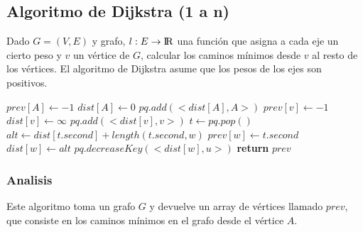 \newpage
\subsection{Algoritmo de Dijkstra (1 a n)}

Dado $G = (V, E)$ y grafo, $l: E \rightarrow {\rm I\!R}$ una funci\'on que asigna a cada eje un cierto peso y $v$ un v\'ertice de $G$, calcular los caminos m\'inimos desde $v$ al resto de los v\'ertices. El algoritmo de Dijkstra asume que los pesos de los ejes son positivos.

\begin{algorithm}
\begin{algorithmic}[1]
  \State $prev[A] \gets -1$
  \State $dist[A] \gets 0$
  \State $pq.add(<dist[A], A>)$
    \State $prev[v] \gets -1$
    \State $dist[v] \gets \infty$
    \State $pq.add(<dist[v], v>)$
  \EndFor
    \State $t \gets pq.pop()$
      \State $alt \gets dist[t.second] + length(t.second, w)$
        \State $prev[w] \gets t.second$
        \State $dist[w] \gets alt$
        \State $pq.decreaseKey(<dist[w], u>)$
      \EndIf
    \EndFor
  \EndWhile
  \State \textbf{return} $prev$
\EndFunction
\end{algorithmic}
\end{algorithm}

\subsubsection*{Analisis}

Este algoritmo toma un grafo $G$ y devuelve un array de v\'ertices llamado $prev$, que consiste en los caminos m\'inimos en el grafo desde el v\'ertice $A$.

